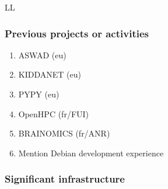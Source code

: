 \begin{sitedescription}{LL}
\subsubsection*{Previous projects or activities}

\begin{enumerate}
\item ASWAD (eu)
\item KIDDANET (eu)
\item PYPY (eu)
\item OpenHPC (fr/FUI)
\item BRAINOMICS (fr/ANR)
\item Mention Debian development experience
\end{enumerate}

\subsubsection*{Significant infrastructure}

\end{sitedescription}



